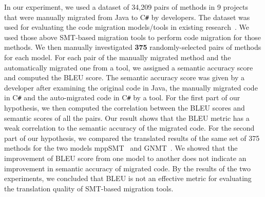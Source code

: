 %

In our experiment, we used a dataset of 34,209 pairs of methods in 9
projects that were manually migrated from Java to C\texttt{\#} by
developers. The dataset was used for evaluating the code migration
models/tools in existing research~\cite{ase15}. We used those above
SMT-based migration tools to perform code migration for those
methods. We then manually investigated {\bf 375} randomly-selected
pairs of methods for each model. For each pair of the manually
migrated method and the automatically migrated one from a tool, we
assigned a semantic accuracy score and computed the BLEU score. The
semantic accuracy score was given by a developer after examining the
original code in Java, the manually migrated code in C\texttt{\#} and
the auto-migrated code in C\texttt{\#} by a tool. For the first part
of our hypothesis, we then computed the correlation between the BLEU
scores and semantic scores of all the pairs. Our result shows that the
BLEU metric has a weak correlation to the semantic accuracy of the
migrated code. For the second part of our hypothesis, we compared the
translated results of the same set of 375 methods for the two models
mppSMT~\cite{ase15} and GNMT~\cite{gnmt}.
%
We showed that the improvement of BLEU score from one model to another
does not indicate an improvement in semantic accuracy of migrated
code.
By the results of the two experiments, we concluded that BLEU is not
an effective metric for evaluating the translation quality of
SMT-based migration tools.

